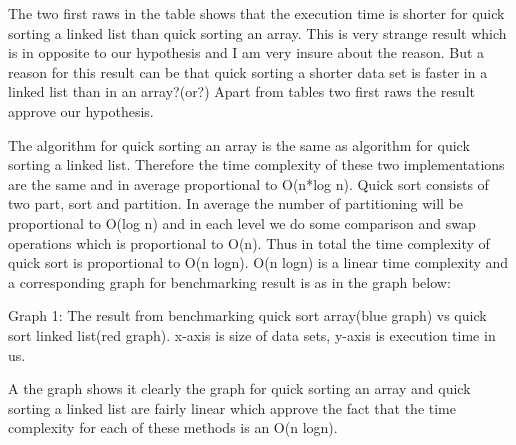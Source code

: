 \documentclass[a4paper,11pt]{article}
\begin{document}
The two first raws in the table shows that the execution time is shorter for quick sorting a linked list than quick sorting an array. This is very strange result which is in opposite to our hypothesis and I am very insure about the reason. But a reason for this result can be that quick sorting a shorter data set is faster in a linked list than in an array?(or?) Apart from tables two first raws the result approve our hypothesis.\newline

The algorithm for quick sorting an array is the same as algorithm for quick sorting a linked list. Therefore the time complexity of these two implementations are the same and in average proportional to O(n*log n). Quick sort consists of two part, sort and partition. In average the number of partitioning will be proportional to O(log n) and in each level we do some comparison and swap operations which is proportional to O(n). Thus in total the time complexity of quick sort is proportional to O(n logn). O(n logn) is a linear time complexity and a corresponding graph for benchmarking result is as in the graph below: 
   
\begin{center}
\newline
\caption{Graph 1: The result from benchmarking quick sort array(blue graph) vs quick sort linked list(red graph). x-axis is size of data sets, y-axis is execution time in us. }
\end{center}\newline

A the graph shows it clearly the graph for quick sorting an array and quick sorting a linked list are fairly linear which approve the fact that the time complexity for each of these methods is an O(n logn).
\end{document}
